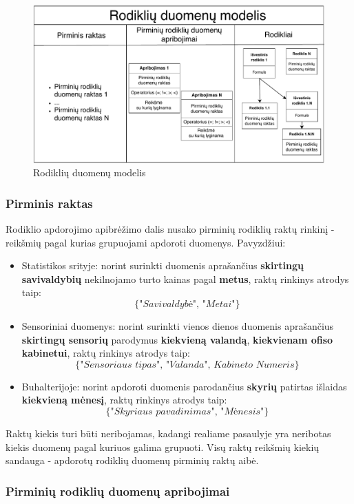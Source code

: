 \documentclass{VUMIFPSbakalaurinis}
\begin{document}
\begin{figure}[H]
    \includegraphics[width=1\textwidth]{img/rodiklio_modelis.pdf}
    \caption{Rodiklių duomenų modelis}
    \label{img:rodiklio_apibrezimas}
\end{figure}

\subsubsection{Pirminis raktas}

Rodiklio apdorojimo apibrėžimo dalis nusako pirminių rodiklių raktų rinkinį - reikšmių pagal kurias grupuojami apdoroti duomenys. Pavyzdžiui:
\begin{itemize}
    \item Statistikos srityje: norint surinkti duomenis aprašančius \textbf{skirtingų savivaldybių} nekilnojamo turto kainas pagal \textbf{metus}, raktų rinkinys atrodys taip: \[\{\textit{"Savivaldybė", "Metai"}\}\]
    \item Sensoriniai duomenys: norint surinkti vienos dienos duomenis aprašančius \textbf{skirtingų sensorių} parodymus \textbf{kiekvieną valandą}, \textbf{kiekvienam ofiso kabinetui}, raktų rinkinys atrodys taip: \[\{\textit{"Sensoriaus tipas", "Valanda", Kabineto Numeris}\}\] 
    \item Buhalterijoje: norint apdoroti duomenis parodančius \textbf{skyrių} patirtas išlaidas \textbf{kiekvieną mėnesį}, raktų rinkinys atrodys taip: \[\{\textit{"Skyriaus pavadinimas", "Mėnesis"}\}\] 
\end{itemize}  \par
Raktų kiekis turi būti neribojamas, kadangi realiame pasaulyje yra neribotas kiekis duomenų pagal kuriuos galima grupuoti. Visų raktų reikšmių kiekių sandauga - apdorotų rodiklių duomenų pirminių raktų aibė. 

\subsubsection{Pirminių rodiklių duomenų apribojimai}
\end{document}
